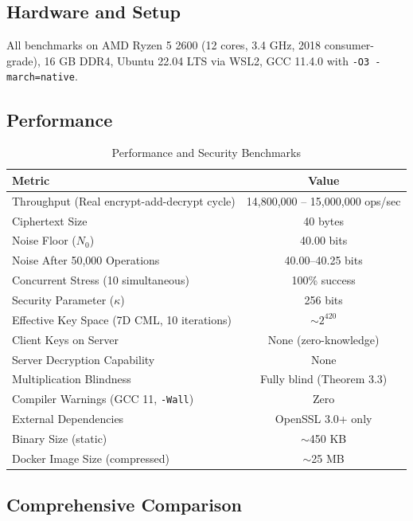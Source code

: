 \documentclass{article}
\begin{document}
\subsection{Hardware and Setup}

All benchmarks on AMD Ryzen 5 2600 (12 cores, 3.4 GHz, 2018 consumer-grade), 16 GB DDR4, Ubuntu 22.04 LTS via WSL2, GCC 11.4.0 with \texttt{-O3 -march=native}.

\subsection{Performance}

\begin{table}[H]
\centering
\begin{tabular}{|l|c|}
\hline
\textbf{Metric} & \textbf{Value} \\
\hline
Throughput (Real encrypt-add-decrypt cycle) & 14,800,000 -- 15,000,000 ops/sec \\
Ciphertext Size & 40 bytes \\
Noise Floor ($N_0$) & 40.00 bits \\
Noise After 50,000 Operations & 40.00--40.25 bits \\
Concurrent Stress (10 simultaneous) & 100\% success \\
Security Parameter ($\kappa$) & 256 bits \\
Effective Key Space (7D CML, 10 iterations) & $\sim 2^{420}$ \\
Client Keys on Server & None (zero-knowledge) \\
Server Decryption Capability & None \\
Multiplication Blindness & Fully blind (Theorem 3.3) \\
Compiler Warnings (GCC 11, \texttt{-Wall}) & Zero \\
External Dependencies & OpenSSL 3.0+ only \\
Binary Size (static) & $\sim$450 KB \\
Docker Image Size (compressed) & $\sim$25 MB \\
\hline
\end{tabular}
\caption{Performance and Security Benchmarks}
\end{table}

\subsection{Comprehensive Comparison}
\end{document}

